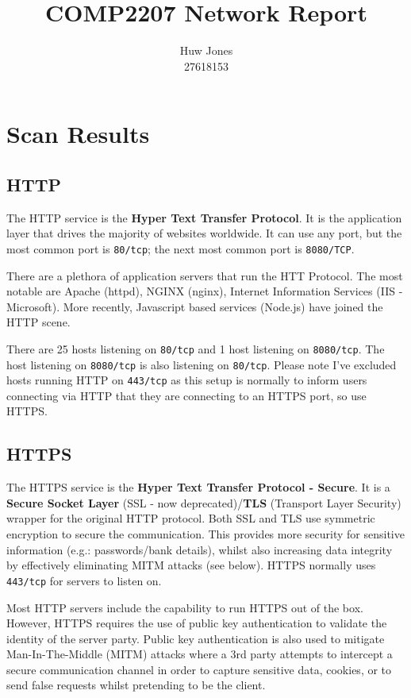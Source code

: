 \documentclass[a4paper]{article}
\author{Huw Jones \\27618153}
\title{COMP2207 Network Report}
\begin{document}
\maketitle
\newpage

\section{Scan Results}
\subsection{HTTP}
The HTTP service is the \textbf{Hyper Text Transfer Protocol}.
It is the application layer that drives the majority of websites worldwide.
It can use any port, but the most common port is \texttt{80/tcp}; the next most common port is \texttt{8080/TCP}.

There are a plethora of application servers that run the HTT Protocol.
The most notable are Apache (httpd), NGINX (nginx), Internet Information Services (IIS - Microsoft).
More recently, Javascript based services (Node.js) have joined the HTTP scene.

There are 25 hosts listening on \texttt{80/tcp} and 1 host listening on \texttt{8080/tcp}.
The host listening on \texttt{8080/tcp} is also listening on \texttt{80/tcp}.
Please note I've excluded hosts running HTTP on \texttt{443/tcp} as this setup is normally to inform users connecting via HTTP that they are connecting to an HTTPS port, so use HTTPS.

\subsection{HTTPS}
The HTTPS service is the \textbf{Hyper Text Transfer Protocol - Secure}.
It is a \textbf{Secure Socket Layer} (SSL - now deprecated)/\textbf{TLS} (Transport Layer Security) wrapper for the original HTTP protocol.
Both SSL and TLS use symmetric encryption to secure the communication.
This provides more security for sensitive information (e.g.: passwords/bank details), whilst also increasing data integrity by effectively eliminating MITM attacks (see below).
HTTPS normally uses \texttt{443/tcp} for servers to listen on.

Most HTTP servers include the capability to run HTTPS out of the box.
However, HTTPS requires the use of public key authentication to validate the identity of the server party.
Public key authentication is also used to mitigate Man-In-The-Middle (MITM) attacks where a 3rd party attempts to intercept a secure communication channel in order to capture sensitive data, cookies, or to send false requests whilst pretending to be the client.
\end{document}
